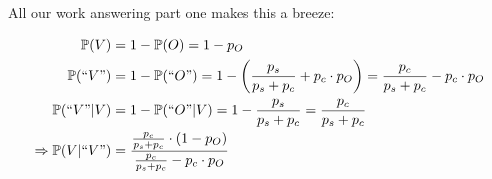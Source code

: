 \documentclass[12 pt]{article}
\begin{document}
\begin{flushleft}
All our work answering part one makes this a breeze:

\begin{align}
\mathbb{P}(V) &= 1 - \mathbb{P}(O) = 1 - p_O \notag \\
\mathbb{P}(``V") &= 1 - \mathbb{P}(``O") = 1 - \left(\frac{p_s}{p_s + p_c} + p_c \cdot p_O \right) = \frac{p_c}{p_s + p_c} - p_c \cdot p_O \notag \\
\mathbb{P}(``V"|V) &= 1 -  \mathbb{P}(``O"|V) = 1 - \frac{p_s}{p_s + p_c} = \frac{p_c}{p_s + p_c} \notag \\
\Rightarrow \mathbb{P}(V|``V") &= \frac{\frac{p_c}{p_s + p_c} \cdot (1 - p_O)}{\frac{p_c}{p_s + p_c} - p_c \cdot p_O} \notag
\end{align}

\end{flushleft}
\end{document}

